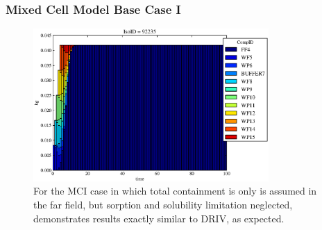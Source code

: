 
\begin{frame}[ctb!]
  \frametitle{Mixed Cell Model Base Case I}
\begin{figure}[ht]
\centering
\includegraphics[width=0.8\textwidth]{./images/mcI.eps}
\caption[$^{235}U$ residence. Mixed Cell Sorption Limitation Without Solubility Limitation.]{
For the MCI case in which total containment is only is assumed in the far field, 
but sorption and solubility limitation neglected, demonstrates results exactly similar to 
DRIV, as expected.}
\label{fig:mcI}
\end{figure}
\end{frame}

